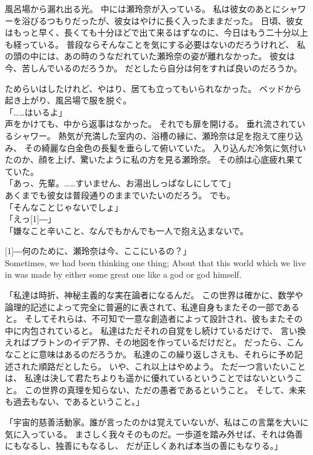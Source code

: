 \documentclass[autodetect-engine,dvipdfmx-if-dvi,a5paper,ja=standard,twoside,titlepage,final,twocolumn]{ltjtbook}
\begin{document}
風呂場から漏れ出る光。
中には瀬玲奈が入っている。
私は彼女のあとにシャワーを浴びるつもりだったが、彼女はやけに長く入ったままだった。
日頃、彼女はもっと早く、長くても十分ほどで出て来るはずなのに、今日はもう二十分以上も経っている。
普段ならそんなことを気にする必要はないのだろうけれど、
私の頭の中には、あの時のうなだれていた瀬玲奈の姿が離れなかった。
彼女は今、苦しんでいるのだろうか。
だとしたら自分は何をすれば良いのだろうか。

ためらいはしたけれど、やはり、居ても立ってもいられなかった。
ベッドから起き上がり、風呂場で服を脱ぐ。\\
「……はいるよ」\\
声をかけても、中から返事はなかった。
それでも扉を開ける。
垂れ流されているシャワー。
熱気が充満した室内の、浴槽の縁に、瀬玲奈は足を抱えて座り込み、
その綺麗な白金色の長髪を垂らして俯いていた。
入り込んだ冷気に気付いたのか、顔を上げ、驚いたように私の方を見る瀬玲奈。
その顔は心底疲れ果てていた。\\
「あっ、先輩。……すいません、お湯出しっぱなしにしてて」\\
あくまでも彼女は普段通りのままでいたいのだろう。
でも。\\
「そんなことじゃないでしょ」\\
「えっ\scalebox{3}[1]{―}」\\
「嫌なこと辛いこと、なんでもかんでも一人で抱え込まないで。

\scalebox{3}[1]{―}何のために、瀬玲奈は今、ここにいるの？」\\

Sometimes, we had been thinking one thing; 
About that this world which we live in 
was made by either some great one like a god or god himself.

「私達は時折、神秘主義的な実在論者になるんだ。
この世界は確かに、数学や論理的記述によって完全に普遍的に表されて、私達自身もまたその一部であると。
そしてそれらは、不可知で一意な創造者によって設計され、彼もまたその中に内包されていると。
私達はただそれの自覚をし続けているだけで、
言い換えればプラトンのイデア界、その地図を作っているだけだと。
だったら、こんなことに意味はあるのだろうか。
私達のこの繰り返しさえも、それらに予め記述された順路だとしたら。
いや、これ以上はやめよう。
ただ一つ言いたいことは、
私達は決して君たちよりも遥かに優れているということではないということ。
この世界の真理を知らない、ただの愚者であるということ。
そして、未来も過去もない、であるということ。」

「宇宙的慈善活動家。誰が言ったのかは覚えていないが、私はこの言葉を大いに気に入っている。
まさしく我々そのものだ。一歩道を踏み外せば、それは偽善にもなるし、独善にもなるし、
だが正しくあれば本当の善にもなりる。」
\end{document}
